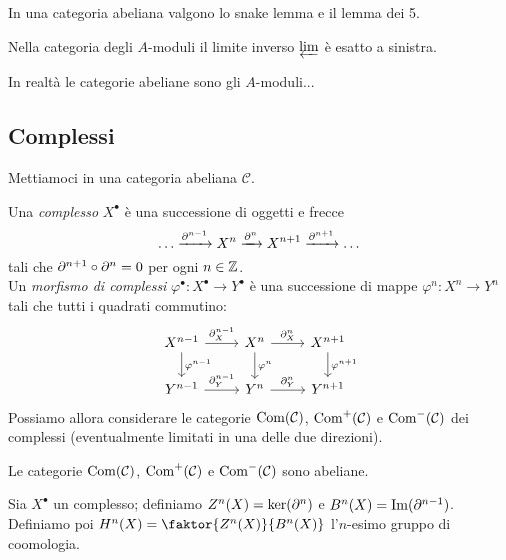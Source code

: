 \begin{proposition}
    In una categoria abeliana valgono lo snake lemma e il lemma dei 5.
\end{proposition}

\begin{lemma}
	Nella categoria degli $ A $-moduli il limite inverso $ \varprojlim $ è esatto a sinistra.
\end{lemma}

\begin{theorem}
    In realtà le categorie abeliane sono gli $A$-moduli...
\end{theorem}

\subsection{Complessi}
Mettiamoci in una categoria abeliana $\mathcal{C}$.

\begin{definition}
    Una \emph{complesso} $X^\bullet$ è una successione di oggetti e frecce $$ \dots\xrightarrow{\partial^{n-1}} X^n \xrightarrow{\partial^{n}} X^{n+1} \xrightarrow{\partial^{n+1}}\dots $$
    tali che $\partial^{n+1}\circ\partial^n = 0$ per ogni $n\in\mathbb{Z}$.\\
    Un \emph{morfismo di complessi} $\varphi^\bullet:X^\bullet\to Y^\bullet$ è una successione di mappe $\varphi^n:X^n\to Y^n$ tali che tutti i quadrati commutino:
    $$\begin{tikzcd}
    X^{n-1} \ar[r,"\de_X^{n-1}"] \ar[d,"\varphi^{n-1}"] & X^{n} \ar[r,"\de_X^{n}"] \ar[d,"\varphi^{n}"] & X^{n+1} \ar[d,"\varphi^{n+1}"] \\
    Y^{n-1} \ar[r,"\de_Y^{n-1}"] & Y^{n} \ar[r,"\de_Y^{n}"] & Y^{n+1}
    \end{tikzcd}$$
    Possiamo allora considerare le categorie $\operatorname{Com}(\mathcal{C})$, $\operatorname{Com}^+(\mathcal{C})$ e $\operatorname{Com}^-(\mathcal{C})$ dei complessi (eventualmente limitati in una delle due direzioni).
\end{definition}

\begin{proposition}
    Le categorie $\operatorname{Com}(\mathcal{C})$, $\operatorname{Com}^+(\mathcal{C})$ e $\operatorname{Com}^-(\mathcal{C})$ sono abeliane.
\end{proposition}

\begin{definition}
    Sia $X^\bullet$ un complesso; definiamo $Z^n(X)=\ker(\partial^n)$ e $B^n(X)=\operatorname{Im}(\partial^{n-1})$. Definiamo poi $H^n(X)=\faktor{Z^n(X)}{B^n(X)}$ l'$n$-esimo gruppo di coomologia.
\end{definition}


